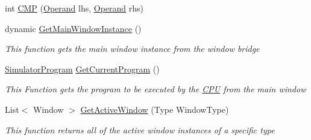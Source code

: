 \begin{DoxyCompactItemize}
\item 
int \hyperlink{class_c_p_u___o_s___simulator_1_1_c_p_u_1_1_instruction_a680092159bb5618a07049546887f1073}{C\+M\+P} (\hyperlink{class_c_p_u___o_s___simulator_1_1_c_p_u_1_1_operand}{Operand} lhs, \hyperlink{class_c_p_u___o_s___simulator_1_1_c_p_u_1_1_operand}{Operand} rhs)
\item 
dynamic \hyperlink{class_c_p_u___o_s___simulator_1_1_c_p_u_1_1_instruction_a6b21a943b331f1c15871302e1ba66882}{Get\+Main\+Window\+Instance} ()
\begin{DoxyCompactList}\small\item\em This function gets the main window instance from the window bridge \end{DoxyCompactList}\item 
\hyperlink{class_c_p_u___o_s___simulator_1_1_c_p_u_1_1_simulator_program}{Simulator\+Program} \hyperlink{class_c_p_u___o_s___simulator_1_1_c_p_u_1_1_instruction_a64441a8d85d6eef7e4c58794cfcdca3c}{Get\+Current\+Program} ()
\begin{DoxyCompactList}\small\item\em This Function gets the program to be executed by the \hyperlink{namespace_c_p_u___o_s___simulator_1_1_c_p_u}{C\+P\+U} from the main window \end{DoxyCompactList}\item 
List$<$ Window $>$ \hyperlink{class_c_p_u___o_s___simulator_1_1_c_p_u_1_1_instruction_a0db56b05531624fbe8d0075f4318cb50}{Get\+Active\+Window} (Type Window\+Type)
\begin{DoxyCompactList}\small\item\em This function returns all of the active window instances of a specific type \end{DoxyCompactList}\end{DoxyCompactItemize}
